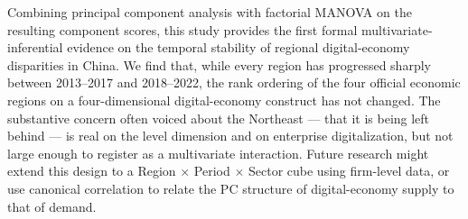 \documentclass[12pt,letterpaper]{article}
\begin{document}
Combining principal component analysis with factorial MANOVA on the resulting
component scores, this study provides the first formal multivariate-inferential
evidence on the temporal stability of regional digital-economy disparities in
China.  We find that, while every region has progressed sharply between
2013--2017 and 2018--2022, the rank ordering of the four official economic
regions on a four-dimensional digital-economy construct has not changed.  The
substantive concern often voiced about the Northeast --- that it is being left
behind --- is real on the level dimension and on enterprise digitalization, but
not large enough to register as a multivariate interaction.  Future research
might extend this design to a Region $\times$ Period $\times$ Sector cube using
firm-level data, or use canonical correlation to relate the PC structure of
digital-economy supply to that of demand.

\newpage
{}
\end{document}

